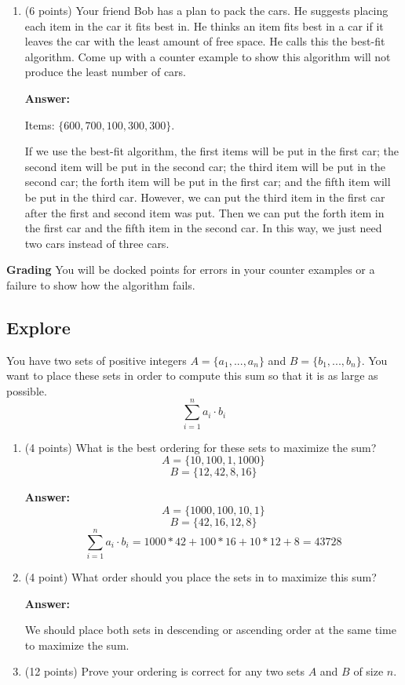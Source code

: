 \documentclass[paper=a4, fontsize=11pt]{scrartcl}
\numberwithin{equation}{section}		%
\numberwithin{figure}{section}			%
\numberwithin{table}{section}				%
\begin{document}
\begin{enumerate}
\item (6 points) Your friend Bob has a plan to pack the cars.  He suggests placing each item in the car it fits best in.  He thinks an item fits best in a car if it leaves the car with the least amount of free space.  He calls this the best-fit algorithm.  Come up with a counter example to show this algorithm will not produce the least number of cars.

\textbf{Answer:}

Items: $\{600,700,100,300,300\}$.

If we use the best-fit algorithm, the first items will be put in the first car; the second item will be put in the second car; the third item will be put in the second car; the forth item will be put in the first car; and the fifth item will be put in the third car. However, we can put the third item in the first car after the first and second item was put. Then we can put the forth item in the first car and the fifth item in the second car. In this way, we just need two cars instead of three cars.





\end{enumerate}

\noindent\textbf{Grading} You will be docked points for errors in your counter examples or a failure to show how the algorithm fails. 

\subsection{Explore}
You have two sets of positive integers $A = \{a_1, ..., a_n\}$ and $B = \{b_1,...,b_n\}$.  You want to place these sets in order to compute this sum so that it is as large as possible.
\[
\sum_{i=1}^n a_i\cdot b_i
\]
\begin{enumerate}
\item (4 points) What is the best ordering for these sets to maximize the sum?
\[
A = \{10, 100, 1, 1000\}
\]
\[
B = \{12, 42, 8, 16\}
\]

\textbf{Answer:}
\[
A = \{1000, 100, 10, 1\}
\]
\[
B = \{42, 16, 12, 8\}
\]
\[
\sum_{i=1}^n a_i\cdot b_i = 1000*42 + 100*16 + 10*12 + 8 = 43728
\]


\item (4 point) What order should you place the sets in to maximize this sum?

\textbf{Answer:}

We should place both sets in descending or ascending order at the same time to maximize the sum.


\item (12 points) Prove your ordering is correct for any two sets $A$ and $B$ of size $n$.
\end{enumerate}
\end{document}
